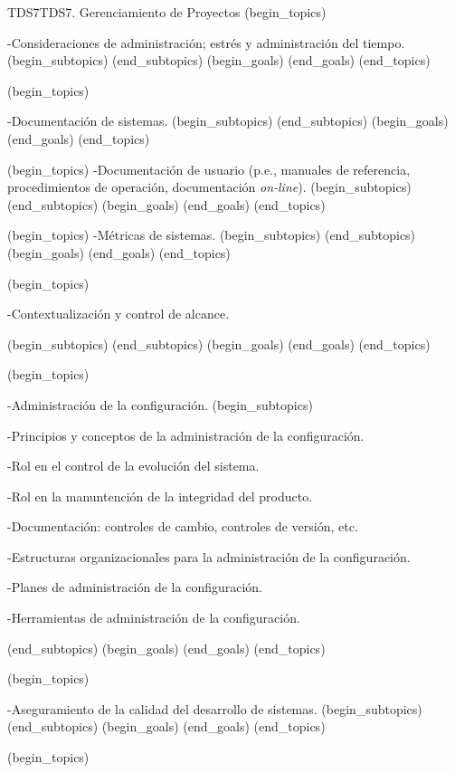 \begin{BKL2}{TDS7}{TDS7. Gerenciamiento de Proyectos}
(begin_topics)

-Consideraciones de administración; estrés y administración del tiempo.
(begin_subtopics)
(end_subtopics)
(begin_goals)
(end_goals)
(end_topics)

 

(begin_topics)

-Documentación de sistemas.
(begin_subtopics)
(end_subtopics)
(begin_goals)
(end_goals)
(end_topics)

 

(begin_topics)
-Documentación de usuario (p.e., manuales de referencia, procedimientos de operación, documentación {\it on-line}).
(begin_subtopics)
(end_subtopics)
(begin_goals)
(end_goals)
(end_topics)

 

(begin_topics)
-Métricas de sistemas.
(begin_subtopics)
(end_subtopics)
(begin_goals)
(end_goals)
(end_topics)

 

(begin_topics)

-Contextualización y control de alcance.

(begin_subtopics)
(end_subtopics)
(begin_goals)
(end_goals)
(end_topics)

 

(begin_topics)

-Administración de la configuración.
(begin_subtopics)

-Principios y conceptos de la administración de la configuración.

-Rol en el control de la evolución del sistema.

-Rol en la manuntención de la integridad del producto.

-Documentación: controles de cambio, controles de versión, etc.

-Estructuras organizacionales para la administración de la configuración.

-Planes de administración de la configuración.

-Herramientas de administración de la configuración.

(end_subtopics)
(begin_goals)
(end_goals)
(end_topics)

 

(begin_topics)

-Aseguramiento de la calidad del desarrollo de sistemas.
(begin_subtopics)
(end_subtopics)
(begin_goals)
(end_goals)
(end_topics)

 

(begin_topics)


\end{BKL2}
